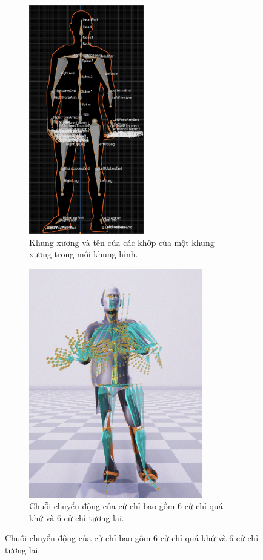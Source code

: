 \begin{figure}[htbp]
	\centering
	\begin{subfigure}{0.49\textwidth}
		\centering
		\includegraphics[height=10cm]{images/Skeleton.png}
		\caption{\small Khung xương và tên của các khớp của một khung xương trong mỗi khung hình.}
		\label{fig:Skeleton}
	\end{subfigure}
	\hfill
	\begin{subfigure}{0.49\textwidth}
		\centering
		\includegraphics[height=10cm]{images/MotionPastAndFuture.png}
		\caption{\small Chuỗi chuyển động của cử chỉ bao gồm 6 cử chỉ quá khứ và 6 cử chỉ tương lai.}
		\label{fig:MotionPastAndFuture}
	\end{subfigure}
\end{figure}


